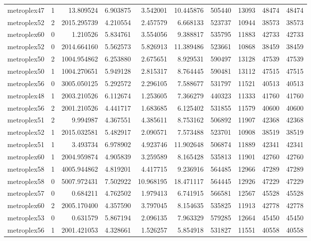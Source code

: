 \begin{longtable}{|l|r|r|r|r|r|r|r|r|r|}
metroplex47 & 1 & 13.809524 & 6.903875 & 3.542001 & 10.445876 & 505440 & 13093 & 48474 & 48474 \\
metroplex52 & 2 & 2015.295739 & 4.210554 & 2.457579 & 6.668133 & 523737 & 10944 & 38573 & 38573 \\
metroplex60 & 0 & 1.210526 & 5.834761 & 3.554056 & 9.388817 & 535795 & 11883 & 42733 & 42733 \\
metroplex52 & 0 & 2014.664160 & 5.562573 & 5.826913 & 11.389486 & 523661 & 10868 & 38459 & 38459 \\
metroplex50 & 2 & 1004.954862 & 6.253880 & 2.675651 & 8.929531 & 590497 & 13128 & 47539 & 47539 \\
metroplex50 & 1 & 1004.270651 & 5.949128 & 2.815317 & 8.764445 & 590481 & 13112 & 47515 & 47515 \\
metroplex56 & 0 & 3005.050125 & 5.292572 & 2.296105 & 7.588677 & 531797 & 11521 & 40513 & 40513 \\
metroplex48 & 1 & 2003.210526 & 6.112674 & 1.253605 & 7.366279 & 440323 & 11333 & 41760 & 41760 \\
metroplex56 & 2 & 2001.210526 & 4.441717 & 1.683685 & 6.125402 & 531855 & 11579 & 40600 & 40600 \\
metroplex51 & 2 & 9.994987 & 4.367551 & 4.385611 & 8.753162 & 506892 & 11907 & 42368 & 42368 \\
metroplex52 & 1 & 2015.032581 & 5.482917 & 2.090571 & 7.573488 & 523701 & 10908 & 38519 & 38519 \\
metroplex51 & 1 & 3.493734 & 6.978902 & 4.923746 & 11.902648 & 506874 & 11889 & 42341 & 42341 \\
metroplex60 & 1 & 2004.959874 & 4.905839 & 3.259589 & 8.165428 & 535813 & 11901 & 42760 & 42760 \\
metroplex58 & 1 & 4005.944862 & 4.819201 & 4.417715 & 9.236916 & 564485 & 12966 & 47289 & 47289 \\
metroplex58 & 0 & 5007.972431 & 7.502922 & 10.968195 & 18.471117 & 564445 & 12926 & 47229 & 47229 \\
metroplex57 & 0 & 0.684211 & 4.762502 & 1.979413 & 6.741915 & 566581 & 12567 & 45528 & 45528 \\
metroplex60 & 2 & 2005.170400 & 4.357590 & 3.797045 & 8.154635 & 535825 & 11913 & 42778 & 42778 \\
metroplex53 & 0 & 0.631579 & 5.867194 & 2.096135 & 7.963329 & 579285 & 12664 & 45450 & 45450 \\
metroplex56 & 1 & 2001.421053 & 4.328661 & 1.526257 & 5.854918 & 531827 & 11551 & 40558 & 40558 \\

\end{longtable}
